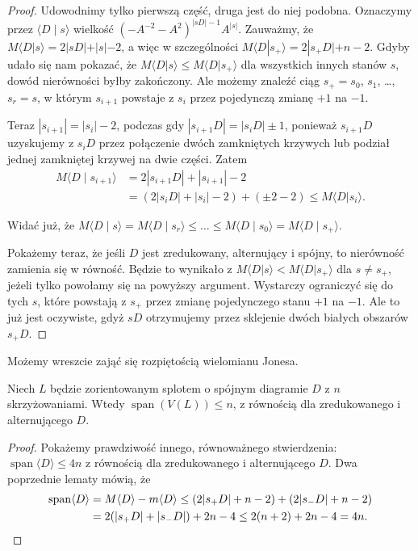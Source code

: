 \begin{proof}
Udowodnimy tylko pierwszą część, druga jest do niej podobna.
Oznaczymy przez $\langle D \mid s \rangle$ wielkość $(-A^{-2}-A^2)^{|sD|-1}A^{|s|}$.
Zauważmy, że $M\langle D|s\rangle=2|sD|+|s|-2$, 
a więc w szczególności $M\langle D|s_+\rangle=2|s_+D|+n-2$.
Gdyby udało się nam pokazać, że $M\langle D|s\rangle \le M\langle D|s_+\rangle$ 
dla wszystkich innych stanów $s$, dowód nierówności byłby zakończony.
Ale możemy znaleźć ciąg $s_+ = s_0$, $s_1$, \ldots, $s_r=s$, 
w którym $s_{i+1}$ powstaje z $s_i$ przez pojedynczą zmianę $+1$ na $-1$.

Teraz $|s_{i+1}|=|s_i|-2$, podczas gdy $|s_{i+1}D|=|s_iD|\pm 1$, 
ponieważ $s_{i+1}D$ uzyskujemy z $s_{i}D$ przez połączenie dwóch zamkniętych krzywych lub podział jednej zamkniętej krzywej na dwie części.
Zatem
\begin{align*}
    M \langle D \mid s_{i+1} \rangle & =
    2|s_{i+1}D|+|s_{i+1}|-2 \\ & =
    (2|s_iD| + |s_i| -2 ) + (\pm 2-2) \le
    M \langle D|s_i\rangle.
\end{align*}

Widać już, że $M\langle D \mid s\rangle =M\langle D \mid s_r\rangle \le\ldots\le M\langle D \mid s_0\rangle=M\langle D \mid s_+\rangle$.

Pokażemy teraz, że jeśli $D$ jest zredukowany, alternujący i spójny, to nierówność zamienia się w równość.
Będzie to wynikało z  $M\langle D|s\rangle<M\langle D| s_+\rangle$
dla $s\neq s_+$, jeżeli tylko powołamy się na powyższy argument.
Wystarczy ograniczyć się do tych $s$, które powstają z $s_+$ przez zmianę pojedynczego stanu $+1$ na $-1$.
Ale to już jest oczywiste, gdyż $sD$ otrzymujemy przez sklejenie dwóch białych obszarów $s_+ D$.
\end{proof}

Możemy wreszcie zająć się rozpiętością wielomianu Jonesa.

\begin{theorem}
Niech $L$ będzie zorientowanym splotem o spójnym diagramie $D$ z $n$ skrzyżowaniami.
Wtedy $\operatorname{span}(V(L)) \le n$, z równością dla zredukowanego i alternującego $D$.
\end{theorem}

\begin{proof}
    Pokażemy prawdziwość innego, równoważnego stwierdzenia: $\operatorname{span} \langle D\rangle\le 4n$ 
    z równością dla zredukowanego i alternującego $D$.
    Dwa poprzednie lematy mówią, że
    \begin{align*}
        \operatorname{span}\langle D\rangle 
        & = M\langle D\rangle - m\langle D\rangle \le (2|s_+D|+n-2)+(2|s_-D|+n-2) \\
        & = 2(|s_+D|+|s_- D|)+2n-4 \le 2(n+2)+2n-4 = 4n. \qedhere
    \end{align*}
\end{proof}

